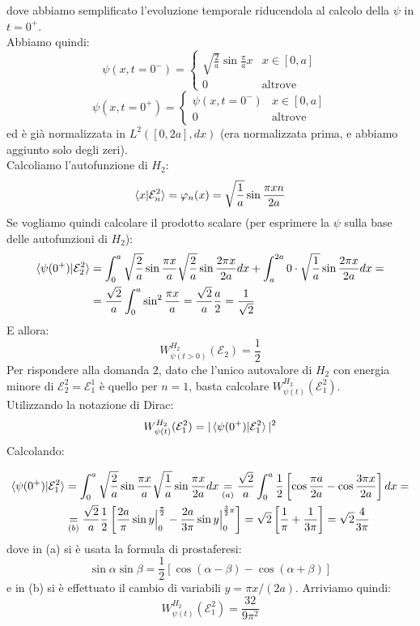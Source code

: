 \documentclass[../../FisicaTeorica.tex]{subfiles}
\begin{document}
dove abbiamo semplificato l'evoluzione temporale riducendola al calcolo della $\psi$ in $t=0^+$.\\
Abbiamo quindi:
\[
\psi(x,t=0^-) = \begin{cases}
\sqrt{\frac{2}{a}} \sin \frac{\pi}{a}x & x \in [0,a]\\
0 & \text{altrove}
\end{cases}
\]
\[
\psi(x,t=0^+) = \begin{cases}
\psi(x,t=0^-) & x \in [0,a]\\
0 & \text{altrove}
\end{cases}
\]
ed è già normalizzata in $L^2([0,2a],dx)$ (era normalizzata prima, e abbiamo aggiunto solo degli zeri).\\
Calcoliamo l'autofunzione di $H_2$:
\[
\braket{x|\mathcal{E}_n^2}=\varphi_n(x)=\sqrt{\frac{1}{a}} \sin \frac{\pi x n}{2a}
\]
Se vogliamo quindi calcolare il prodotto scalare (per esprimere la $\psi$ sulla base delle autofunzioni di $H_2$):
\begin{align*}
\braket{\psi(0^+)|\mathcal{E}_2^2} &= \int_0^a \sqrt{\frac{2}{a}}\sin \frac{\pi x}{a} \sqrt{\frac{2}{a}}\sin \frac{2\pi x}{2a} dx +\int_a^{2a} 0\cdot \sqrt{\frac{1}{a}} \sin \frac{2\pi x}{2a}dx =\\
&= \frac{\sqrt{2}}{a}\int_0^a \sin^2 \frac{\pi x}{a}= \frac{\sqrt{2}}{a}\frac{a}{2}=\frac{1}{\sqrt{2}}
\end{align*}
E allora:
\[
W^{H_2}_{\psi(t>0)}(\mathcal{E}_2) = \frac{1}{2}
\]
Per rispondere alla domanda $2$, dato che l'unico autovalore di $H_2$ con energia minore di $\mathcal{E}_2^2=\mathcal{E}_1^1$ è quello per $n=1$, basta calcolare $W^{H_2}_{\psi(t)}(\mathcal{E}_1^2)$.\\
Utilizzando la notazione di Dirac:
\[
W^{H_2}_{\psi(t)}(\mathcal{E}_1^2) = |\braket{\psi(0^+)|\mathcal{E}_1^2}|^2
\]
Calcolando:

\begin{align*}
\braket{\psi(0^+)|\mathcal{E}_1^2} &= \int_0^a \sqrt{\frac{2}{a}} \sin \frac{\pi x}{a} \sqrt{\frac{1}{a}} \sin \frac{\pi x}{2a} dx\underset{(a)}{=} \frac{\sqrt{2}}{a} \int_0^a \frac{1}{2} \left [
\cos \frac{\pi a}{2a}-\cos \frac{3\pi x}{2a}
\right ]dx =\\
&\underset{(b)}{=}\frac{\sqrt{2}}{a}\frac{1}{2}\left [
\frac{2a}{\pi} \sin y \Big |_0^{\frac{\pi}{2}} - \frac{2a}{3\pi}\sin y \Big|_{0}^{\frac{3}{2}\pi}\right ] = \sqrt{2}\left [
\frac{1}{\pi}+\frac{1}{3\pi}
\right] = \sqrt{2}\frac{4}{3\pi}
\end{align*}
dove in (a) si è usata la formula di prostaferesi:
\[
\sin \alpha \sin \beta= \frac{1}{2}[\cos(\alpha-\beta)-\cos(\alpha+\beta)]
\]
e in (b) si è effettuato il cambio di variabili $y=\pi x/(2a)$.
Arriviamo quindi:
\[
W_{\psi(t)}^{H_2}(\mathcal{E}_1^2)=\frac{32}{9\pi^2}
\]
\end{document}
